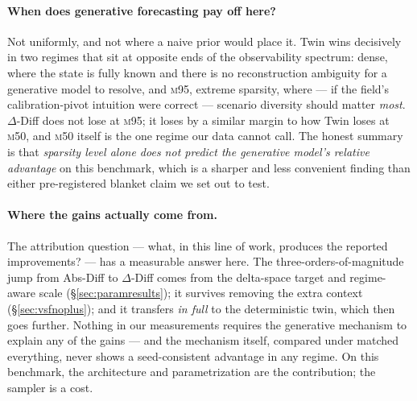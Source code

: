 \documentclass[11pt]{article}
\newcommand{\ours}{\mbox{$\Delta$-Diff}}       %
\newcommand{\absdiff}{\mbox{Abs-Diff}}          %
\newcommand{\twin}{\mbox{Twin}}                 %
\newcommand{\mfifty}{\textsc{m50}}
\newcommand{\mninetyfive}{\textsc{m95}}
\begin{document}
\paragraph{When does generative forecasting pay off here?} Not uniformly,
and not where a naive prior would place it. \twin{} wins decisively in two
regimes that sit at opposite ends of the observability spectrum: dense,
where the state is fully known and there is no reconstruction ambiguity
for a generative model to resolve, and \mninetyfive{}, extreme sparsity,
where --- if the field's calibration-pivot intuition were correct ---
scenario diversity should matter \emph{most}. \ours{} does not lose at
\mninetyfive{}; it loses by a similar margin to how \twin{} loses at
\mfifty{}, and \mfifty{} itself is the one regime our data cannot call.
The honest summary is that \emph{sparsity level alone does not predict
the generative model's relative advantage} on this benchmark, which is a
sharper and less convenient finding than either pre-registered blanket
claim we set out to test.

\paragraph{Where the gains actually come from.} The attribution question
--- what, in this line of work, produces the reported improvements? ---
has a measurable answer here. The three-orders-of-magnitude jump from
\absdiff{} to \ours{} comes from the delta-space target and regime-aware
scale (\S\ref{sec:paramresults}); it survives removing the extra context
(\S\ref{sec:vsfnoplus}); and it transfers \emph{in full} to the
deterministic twin, which then goes further. Nothing in our measurements
requires the generative mechanism to explain any of the gains --- and the
mechanism itself, compared under matched everything, never shows a
seed-consistent advantage in any regime. On this benchmark, the
architecture and parametrization are the contribution; the sampler is a
cost.
\end{document}
